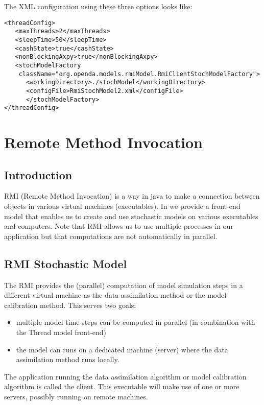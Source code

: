 The XML configuration using these three options looks like:
{\small
\begin{verbatim}
<threadConfig>
   <maxThreads>2</maxThreads>
   <sleepTime>50</sleepTime>
   <cashState>true</cashState>
   <nonBlockingAxpy>true</nonBlockingAxpy>
   <stochModelFactory
    className="org.openda.models.rmiModel.RmiClientStochModelFactory">
      <workingDirectory>./stochModel</workingDirectory>
      <configFile>RmiStochModel2.xml</configFile>
      </stochModelFactory>
</threadConfig>
\end{verbatim}
}

\section{Remote Method Invocation}

\subsection{Introduction}
RMI (Remote Method Invocation) is a way in java to make a connection between
objects in various virtual machines (executables). In \oda we provide a
front-end model that enables us to create and use stochastic models on various
executables and computers. Note that RMI allows us to use multiple processes in
our application but that computations are not automatically in parallel.

\subsection{RMI Stochastic Model}
The RMI provides the (parallel) computation of model simulation steps in a
different virtual machine as the data assimilation method or the model
calibration method. This serves two goals:
\begin{itemize}
\item multiple model time steps can be computed in parallel (in combination
  with the Thread model front-end)
\item the model can runs on a dedicated machine (server) where the data
  assimilation method runs locally.
\end{itemize}

The \oda application running the data assimilation algorithm or model
calibration algorithm is called the client. This executable will make use of
one or more servers, possibly running on remote machines.

